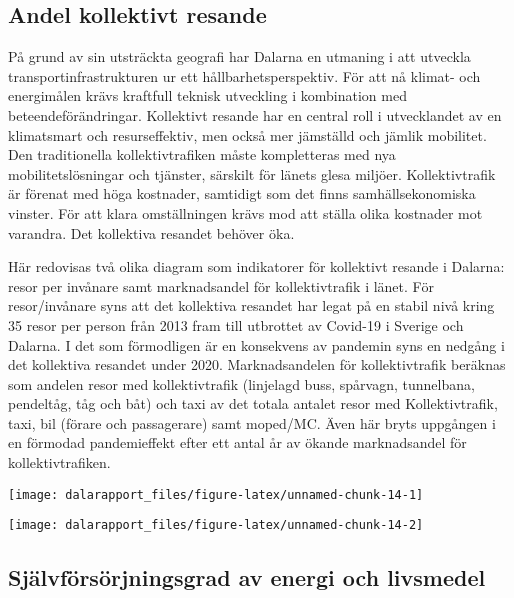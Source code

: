 \documentclass[
]{article}
\begin{document}
\hypertarget{andel-kollektivt-resande}{%
\subsection{Andel kollektivt resande}\label{andel-kollektivt-resande}}

På grund av sin utsträckta geografi har Dalarna en utmaning i att
utveckla transportinfrastrukturen ur ett hållbarhetsperspektiv. För att
nå klimat- och energimålen krävs kraftfull teknisk utveckling i
kombination med beteendeförändringar. Kollektivt resande har en central
roll i utvecklandet av en klimatsmart och resurseffektiv, men också mer
jämställd och jämlik mobilitet. Den traditionella kollektivtrafiken
måste kompletteras med nya mobilitetslösningar och tjänster, särskilt
för länets glesa miljöer. Kollektivtrafik är förenat med höga kostnader,
samtidigt som det finns samhällsekonomiska vinster. För att klara
omställningen krävs mod att ställa olika kostnader mot varandra. Det
kollektiva resandet behöver öka.

Här redovisas två olika diagram som indikatorer för kollektivt resande i
Dalarna: resor per invånare samt marknadsandel för kollektivtrafik i
länet. För resor/invånare syns att det kollektiva resandet har legat på
en stabil nivå kring 35 resor per person från 2013 fram till utbrottet
av Covid-19 i Sverige och Dalarna. I det som förmodligen är en
konsekvens av pandemin syns en nedgång i det kollektiva resandet under
2020. Marknadsandelen för kollektivtrafik beräknas som andelen resor med
kollektivtrafik (linjelagd buss, spårvagn, tunnelbana, pendeltåg, tåg
och båt) och taxi av det totala antalet resor med Kollektivtrafik, taxi,
bil (förare och passagerare) samt moped/MC. Även här bryts uppgången i
en förmodad pandemieffekt efter ett antal år av ökande marknadsandel för
kollektivtrafiken.

\begin{center}\texttt{[image: dalarapport\_files/figure-latex/unnamed-chunk-14-1]} \end{center}

\begin{center}\texttt{[image: dalarapport\_files/figure-latex/unnamed-chunk-14-2]} \end{center}

\hypertarget{sjuxe4lvfuxf6rsuxf6rjningsgrad-av-energi-och-livsmedel}{%
\subsection{Självförsörjningsgrad av energi och
livsmedel}\label{sjuxe4lvfuxf6rsuxf6rjningsgrad-av-energi-och-livsmedel}}
\end{document}
